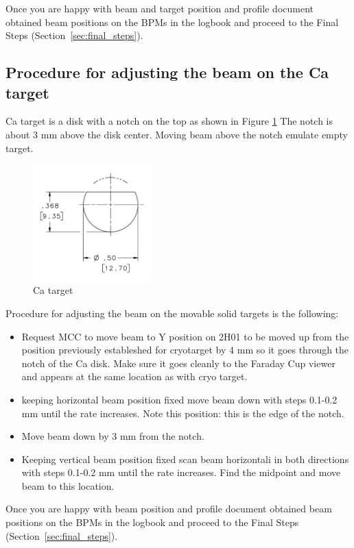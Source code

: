 Once you are happy with beam and target position and profile document obtained beam positions on the BPMs in the logbook and proceed to the Final Steps (Section~\ref{sec:final_steps}).

\subsection{Procedure for adjusting the beam on the Ca target} \label{sec:Ca}
Ca target is a disk with a notch on the top as shown in Figure \ref{fig:Ca}
The notch is about 3 mm above the disk center. Moving beam above the notch emulate empty target.

\begin{figure}[htb!]
\centering
\includegraphics[width=0.4\textwidth]{Ca_target.png}
\caption{Ca target}
\label{fig:Ca}
\end{figure}

Procedure for adjusting the beam on the movable solid targets is the following:
\begin{itemize}
\item Request MCC to move beam to Y position on 2H01 to be moved up from the position previously estableshed for cryotarget by 4 mm so it goes through the notch of the Ca disk. Make sure it goes cleanly to the Faraday Cup viewer and appears at the same location as with cryo target.
\item keeping horizontal beam position fixed move beam down with steps 0.1-0.2 mm until the rate increases. 
Note this position: this is the edge of the notch. 
\item Move beam down by 3 mm from the notch.
\item Keeping vertical beam position fixed scan beam horizontali in both directions with steps 0.1-0.2 mm until the rate increases. Find the midpoint and move beam to this location.
\end{itemize}
Once you are happy with beam position and profile document obtained beam positions on the BPMs in the logbook and proceed to the Final Steps (Section~\ref{sec:final_steps}).


